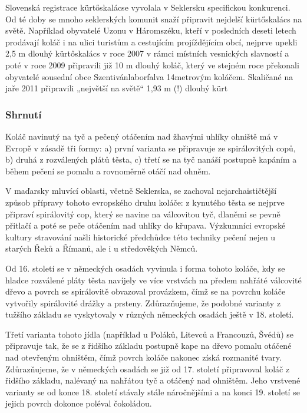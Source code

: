 Slovenská registrace kürtőskalácse vyvolala v Seklersku specifickou
konkurenci. Od té doby se mnoho seklerských komunit snaží připravit
nejdelší kürtőskalács na světě. Například obyvatelé Uzonu v Háromszéku,
kteří v posledních deseti letech prodávají koláč i na ulici turistům a
cestujícím projíždějícím obcí, nejprve upekli 2,5 m dlouhý kürtőskalács
v roce 2007 v rámci místních vesnických slavností a poté v roce 2009
připravili již 10 m dlouhý koláč, který ve stejném roce překonali
obyvatelé sousední obce Szentivánlaborfalva 14metrovým koláčem.
Skaličané na jaře 2011 připravili „největší na světě`` 1,93 m (!) dlouhý
kürt

\subsubsection{Shrnutí}\label{250319-1326}

Koláč navinutý na tyč a pečený otáčením nad žhavými uhlíky ohniště má v
Evropě v zásadě tři formy: a) první varianta se připravuje ze
spirálovitých copů, b) druhá z rozválených plátů těsta, c) třetí se na
tyč nanáší postupně kapáním a během pečení se pomalu a rovnoměrně otáčí
nad ohněm.

V maďarsky mluvící oblasti, včetně Seklerska, se zachoval
nejarchaističtější způsob přípravy tohoto evropského druhu koláče: z
kynutého těsta se nejprve připraví spirálovitý cop, který se navine na
válcovitou tyč, dlaněmi se pevně přitlačí a poté se peče otáčením nad
uhlíky do křupava. Výzkumníci evropské kultury stravování našli
historické předchůdce této techniky pečení nejen u starých Řeků a
Římanů, ale i u středověkých Němců.

Od 16. století se v německých osadách vyvinula i forma tohoto koláče,
kdy se hladce rozválené pláty těsta navíjely ve více vrstvách na předem
nahřáté válcovité dřevo a povrch se spirálovitě obvazoval provázkem,
čímž se na povrchu koláče vytvořily spirálovité drážky a prsteny.
Zdůrazňujeme, že podobné varianty z tužšího základu se vyskytovaly v
různých německých osadách ještě v 18. století.

Třetí varianta tohoto jídla (například u Poláků, Litevců a Francouzů,
Švédů) se připravuje tak, že se z řidšího základu postupně kape na dřevo
pomalu otáčené nad otevřeným ohništěm, čímž povrch koláče nakonec získá
rozmanité tvary. Zdůrazňujeme, že v německých osadách se již od 17.
století připravoval koláč z řidšího základu, nalévaný na nahřátou tyč a
otáčený nad ohništěm. Jeho vrstvené varianty se od konce 18. století
stávaly stále náročnějšími a na konci 19. století se jejich povrch
dokonce poléval čokoládou.

